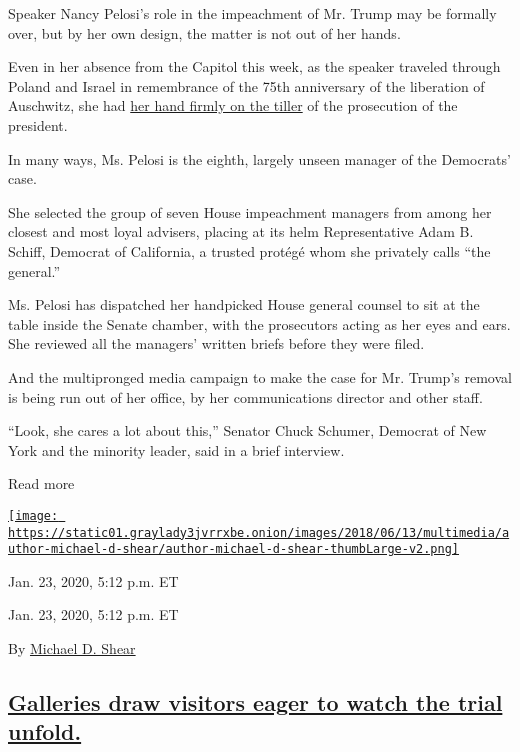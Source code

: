 Speaker Nancy Pelosi's role in the impeachment of Mr. Trump may be
formally over, but by her own design, the matter is not out of her
hands.

Even in her absence from the Capitol this week, as the speaker traveled
through Poland and Israel in remembrance of the 75th anniversary of the
liberation of Auschwitz, she had
\href{https://www.nytimes3xbfgragh.onion/2020/01/23/us/politics/pelosi-trump-impeachment.html}{her
hand firmly on the tiller} of the prosecution of the president.

In many ways, Ms. Pelosi is the eighth, largely unseen manager of the
Democrats' case.

She selected the group of seven House impeachment managers from among
her closest and most loyal advisers, placing at its helm Representative
Adam B. Schiff, Democrat of California, a trusted protégé whom she
privately calls ``the general.''

Ms. Pelosi has dispatched her handpicked House general counsel to sit at
the table inside the Senate chamber, with the prosecutors acting as her
eyes and ears. She reviewed all the managers' written briefs before they
were filed.

And the multipronged media campaign to make the case for Mr. Trump's
removal is being run out of her office, by her communications director
and other staff.

``Look, she cares a lot about this,'' Senator Chuck Schumer, Democrat of
New York and the minority leader, said in a brief interview.

Read more

\href{https://www.nytimes3xbfgragh.onion/by/michael-d-shear}{\texttt{[image: https://static01.graylady3jvrrxbe.onion/images/2018/06/13/multimedia/author-michael-d-shear/author-michael-d-shear-thumbLarge-v2.png]}}

Jan. 23, 2020, 5:12 p.m. ET

Jan. 23, 2020, 5:12 p.m. ET

By \href{https://www.nytimes3xbfgragh.onion/by/michael-d-shear}{Michael
D. Shear}

\hypertarget{galleries-draw-visitors-eager-to-watch-the-trial-unfold}{%
\subsection{\texorpdfstring{\protect\hyperlink{galleries-trial-senate}{Galleries
draw visitors eager to watch the trial
unfold.}}{Galleries draw visitors eager to watch the trial unfold.}}\label{galleries-draw-visitors-eager-to-watch-the-trial-unfold}}


